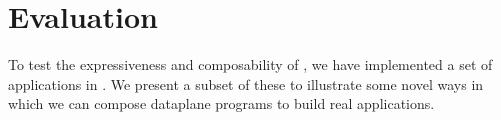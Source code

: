 \documentclass[letterpaper,twocolumn,10pt]{article}
\begin{document}





\section{Evaluation}
\label{sec:evaluation}
To test the expressiveness and composability of \ulang, we have
implemented a set of applications in \ulang. We present a subset of
these to illustrate some novel ways in which  we can compose dataplane
programs to build real applications.
\end{document}
